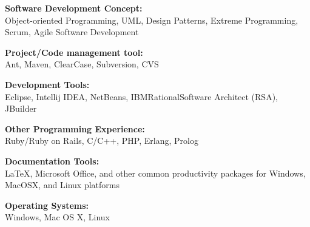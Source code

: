 \documentclass[10pt]{article}
\newcommand{\blankline}{\quad\pagebreak[2]}
\begin{document}
\blankline

{\textbf{Software Development Concept:}}\\
Object-oriented Programming, UML, Design \nolinebreak Patterns, Extreme Programming, Scrum, Agile Software Development

\blankline

{\textbf{Project/Code management tool:}}\\
Ant, Maven, ClearCase, Subversion, CVS

\blankline

{\textbf{Development Tools:}}\\
Eclipse, Intellij IDEA, NetBeans, IBM\circledR\space Rational\circledR\space Software Architect (RSA), JBuilder

\blankline

{\textbf{Other Programming Experience:}}\\
Ruby/Ruby on Rails, C/C++, PHP, Erlang, Prolog

\blankline

{\textbf{Documentation Tools:}}\\ 
\LaTeX{}, Microsoft Office,
and other common productivity packages for Windows, Mac\nolinebreak OS\nolinebreak X, and
Linux platforms

\blankline

{\textbf{Operating Systems:}}\\
Windows, Mac OS X, Linux

\newpage
\end{document}

